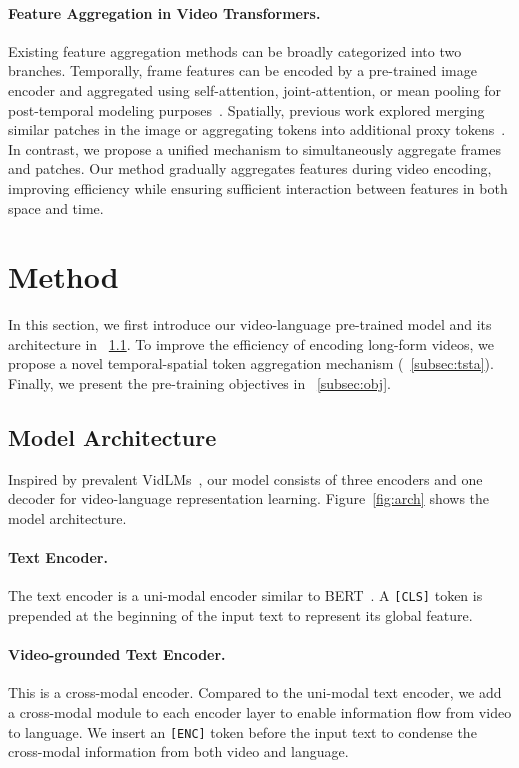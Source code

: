 \documentclass[11pt]{article}
\begin{document}
\paragraph{Feature Aggregation in Video Transformers.}
Existing feature aggregation methods can be broadly categorized into two branches. 
Temporally, frame features can be encoded by a pre-trained image encoder and aggregated using self-attention, joint-attention, or mean pooling for post-temporal modeling purposes~\citep{Bain2022ACG, Luo2021CLIP4ClipAE}. 
Spatially, previous work explored merging similar patches in the image or aggregating tokens into additional proxy tokens~\citep{Bolya2022TokenMY, Shi2023CrossGETCE, Cao2023PuMerPA, Xu2022GroupViTSS, Ryoo2021TokenLearnerWC, Marin2021TokenPI}. 
In contrast, we propose a unified mechanism to simultaneously aggregate frames and patches. Our method gradually aggregates features during video encoding, improving efficiency while ensuring sufficient interaction between features in both space and time. 



\section{Method}
\label{sec:method}
In this section, we first introduce our video-language pre-trained model and its architecture in \textsection~\ref{subsec:arch}. To improve the efficiency of encoding long-form videos, we propose a novel temporal-spatial token aggregation mechanism (\textsection~\ref{subsec:tsta}). Finally, we present the pre-training objectives in \textsection~\ref{subsec:obj}. 

\subsection{Model Architecture}
\label{subsec:arch}
Inspired by prevalent VidLMs~\citep{Li2022BLIPBL, Li2021AlignBF}, our model consists of three encoders and one decoder for video-language representation learning. 
Figure~\ref{fig:arch} shows the model architecture. 

\paragraph{Text Encoder.} The text encoder is a uni-modal encoder similar to BERT~\citep{Devlin2019BERTPO}. A \texttt{[CLS]} token is prepended at the beginning of the input text to represent its global feature.

\paragraph{Video-grounded Text Encoder.} This is a cross-modal encoder. Compared to the uni-modal text encoder, we add a cross-modal module to each encoder layer to enable information flow from video to language. We insert an \texttt{[ENC]} token before the input text to condense the cross-modal information from both video and language. 
\end{document}
